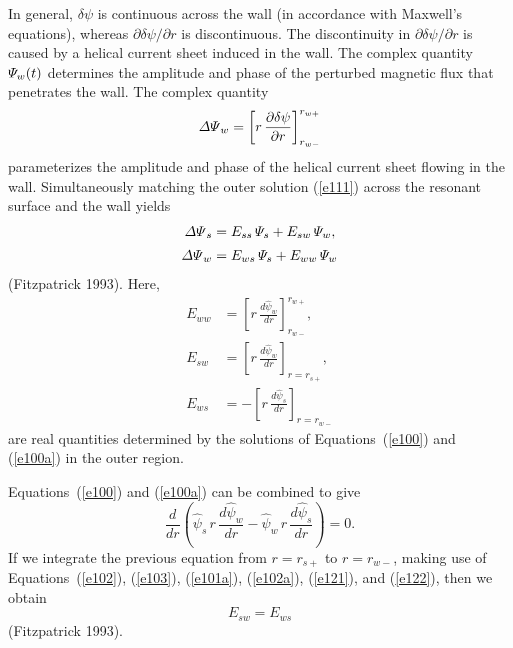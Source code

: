 \documentclass[notitlepage,12pt]{article}
\begin{document}
In general, $\delta\psi$ is continuous across the wall (in accordance with Maxwell's equations), whereas $\partial\delta\psi/\partial r$ is discontinuous. The discontinuity in $\partial\delta\psi/\partial r$ is caused by a helical current sheet induced in the wall. The complex quantity ${\mit\Psi}_w(t)$ determines the amplitude and
phase of the perturbed magnetic flux that penetrates the wall. The complex quantity
\begin{equation}\label{e118}
{\mit\Delta\Psi}_w = \left[r\,\frac{\partial\delta\psi}{\partial r}\right]_{r_{w-}}^{r_{w+}}
\end{equation}
parameterizes the amplitude and phase of the helical current sheet flowing in the wall.
Simultaneously matching the outer solution (\ref{e111}) across the resonant surface and the wall yields
\begin{align}
{\mit\Delta\Psi}_s &= E_{ss}\,{\mit\Psi}_s + E_{sw}\,{\mit\Psi}_w,\\[0.5ex]
{\mit\Delta\Psi}_w &= E_{ws}\,{\mit\Psi}_s+ E_{ww}\,{\mit\Psi}_w
\end{align}
(Fitzpatrick 1993).
Here,
\begin{align}
E_{ww}&= \left[r\,\frac{d\hat{\psi}_w}{dr}\right]_{r_{w-}}^{r_{w+}},\\[0.5ex]
E_{sw} &=\left[r\,\frac{{d\hat\psi}_w}{dr}\right]_{r=r_{s+}},\label{e121}\\[0.5ex]
E_{ws} &=-\left[r\,\frac{{d\hat\psi}_s}{dr}\right]_{r=r_{w-}}\label{e122}
\end{align}
are real quantities determined by the solutions of Equations~(\ref{e100}) and (\ref{e100a}) in the outer region.

Equations~(\ref{e100}) and (\ref{e100a}) can be combined to give
\begin{equation}
\frac{d}{dr}\!\left(\hat{\psi}_s\,r\,\frac{d\hat{\psi}_w}{dr} - \hat{\psi}_w\,r\,\frac{d\hat{\psi}_s}{dr}\right) = 0.
\end{equation}
If we integrate the previous equation from $r=r_{s+}$ to $r=r_{w-}$, making use of Equations~(\ref{e102}), (\ref{e103}), (\ref{e101a}), (\ref{e102a}), (\ref{e121}),
and (\ref{e122}), then we obtain
\begin{equation}\label{e123}
E_{sw} = E_{ws}
\end{equation}
(Fitzpatrick 1993). 
\end{document}
